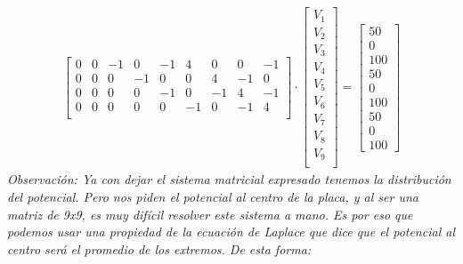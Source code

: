 \documentclass[
  11pt,
  letterpaper,
   answers
  ]{exam}
\begin{document}
\begin{questions}
\begin{solution}
\begin{align}
\begin{bmatrix}
        0 & 0 & -1 & 0 & -1 & 4 & 0 & 0 & -1 \\
        0 & 0 & 0 & -1 & 0 & 0 & 4 & -1 & 0 \\
        0 & 0 & 0 & 0 & -1 & 0 & -1 & 4 & -1 \\
        0 & 0 & 0 & 0 & 0 & -1 & 0 & -1 & 4 \\
    \end{bmatrix}
    \cdot \begin{bmatrix}
        V_1 \\
        V_2 \\
        V_3 \\
        V_4 \\
        V_5 \\
        V_6 \\
        V_7 \\
        V_8 \\
        V_9 \\
    \end{bmatrix}
    =
    \begin{bmatrix}
        50 \\
        0 \\
        100 \\
        50 \\
        0 \\
        100 \\
        50 \\
        0 \\
        100
    \end{bmatrix}
\end{align}
\textit{Observación: Ya con dejar el sistema matricial expresado tenemos la distribución del potencial. Pero nos piden el potencial al centro de la placa, y al ser una matriz de 9x9, es muy difícil resolver este sistema a mano. Es por eso que podemos usar una propiedad de la ecuación de Laplace que dice que el potencial al centro será el promedio de los extremos. De esta forma:}


\end{solution}
\end{questions}
\end{document}
